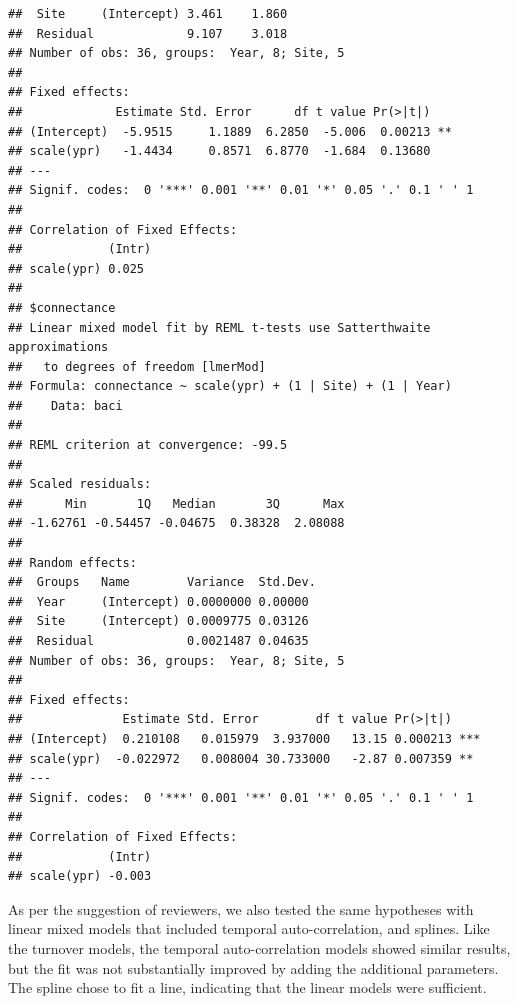 \documentclass{article}\usepackage[]{graphicx}\usepackage[]{color}
\makeatletter
\newenvironment{kframe}{%
 \def\at@end@of@kframe{}%
 \ifinner\ifhmode%
  \def\at@end@of@kframe{\end{minipage}}%
  \begin{minipage}{\columnwidth}%
 \fi\fi%
 \def\FrameCommand##1{\hskip\@totalleftmargin \hskip-\fboxsep
 \colorbox{shadecolor}{##1}\hskip-\fboxsep
     \hskip-\linewidth \hskip-\@totalleftmargin \hskip\columnwidth}%
 \MakeFramed {\advance\hsize-\width
   \@totalleftmargin\z@ \linewidth\hsize
   \@setminipage}}%
 {\par\unskip\endMakeFramed%
 \at@end@of@kframe}
\newenvironment{knitrout}{}{} %
\makeatother
\begin{document}
\begin{knitrout}
\begin{kframe}
\begin{verbatim}
##  Site     (Intercept) 3.461    1.860   
##  Residual             9.107    3.018   
## Number of obs: 36, groups:  Year, 8; Site, 5
## 
## Fixed effects:
##             Estimate Std. Error      df t value Pr(>|t|)   
## (Intercept)  -5.9515     1.1889  6.2850  -5.006  0.00213 **
## scale(ypr)   -1.4434     0.8571  6.8770  -1.684  0.13680   
## ---
## Signif. codes:  0 '***' 0.001 '**' 0.01 '*' 0.05 '.' 0.1 ' ' 1
## 
## Correlation of Fixed Effects:
##            (Intr)
## scale(ypr) 0.025 
## 
## $connectance
## Linear mixed model fit by REML t-tests use Satterthwaite approximations
##   to degrees of freedom [lmerMod]
## Formula: connectance ~ scale(ypr) + (1 | Site) + (1 | Year)
##    Data: baci
## 
## REML criterion at convergence: -99.5
## 
## Scaled residuals: 
##      Min       1Q   Median       3Q      Max 
## -1.62761 -0.54457 -0.04675  0.38328  2.08088 
## 
## Random effects:
##  Groups   Name        Variance  Std.Dev.
##  Year     (Intercept) 0.0000000 0.00000 
##  Site     (Intercept) 0.0009775 0.03126 
##  Residual             0.0021487 0.04635 
## Number of obs: 36, groups:  Year, 8; Site, 5
## 
## Fixed effects:
##              Estimate Std. Error        df t value Pr(>|t|)    
## (Intercept)  0.210108   0.015979  3.937000   13.15 0.000213 ***
## scale(ypr)  -0.022972   0.008004 30.733000   -2.87 0.007359 ** 
## ---
## Signif. codes:  0 '***' 0.001 '**' 0.01 '*' 0.05 '.' 0.1 ' ' 1
## 
## Correlation of Fixed Effects:
##            (Intr)
## scale(ypr) -0.003
\end{verbatim}
\end{kframe}
\end{knitrout}

As per the suggestion of reviewers, we also tested the same hypotheses
with linear mixed models that included temporal auto-correlation, and
splines. Like the turnover models, the temporal auto-correlation
models showed similar results, but the fit was not substantially
improved by adding the additional parameters. The spline chose to fit
a line, indicating that the linear models were sufficient.
\end{document}
